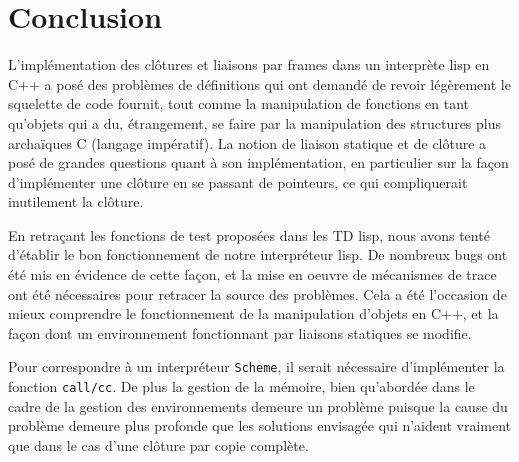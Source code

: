 \documentclass[a4paper,11pt]{article}
\begin{document}
\section{Conclusion}

L'implémentation des clôtures et liaisons par frames dans un interprète lisp en
C++ a posé des problèmes de définitions qui ont demandé de revoir légèrement le
squelette de code fournit, tout comme la manipulation de fonctions en tant
qu'objets qui a du, étrangement, se faire par la manipulation des structures
plus archaïques C (langage impératif). La notion de liaison statique et de clôture a posé de
grandes questions quant à son implémentation, en particulier sur la façon
d'implémenter une clôture en se passant de pointeurs, ce qui compliquerait
inutilement la clôture.

En retraçant les fonctions de test proposées dans les TD lisp, nous avons tenté
d'établir le bon fonctionnement de notre interpréteur lisp. De nombreux bugs ont
été mis en évidence de cette façon, et la mise en oeuvre de mécanismes de trace
ont été nécessaires pour retracer la source des problèmes. Cela a été l'occasion
de mieux comprendre le fonctionnement de la manipulation d'objets en C++, et la
façon dont un environnement fonctionnant par liaisons statiques se modifie.

Pour correspondre à un interpréteur \texttt{Scheme}, il serait nécessaire
d'implémenter la fonction \texttt{call/cc}. De plus la gestion de la mémoire,
bien qu'abordée dans le cadre de la gestion des environnements demeure un
problème puisque la cause du problème demeure plus profonde que les solutions
envisagée qui n'aident vraiment que dans le cas d'une clôture par copie complète.
\end{document}

